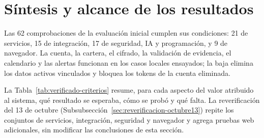 \section{Síntesis y alcance de los resultados}\label{sec:resultados-pruebas}

Las 62 comprobaciones de la evaluación inicial cumplen sus condiciones: 21 de servicios, 15 de integración, 17 de seguridad, IA y programación, y 9 de navegador. La cuenta, la cartera, el cifrado, la validación de evidencia, el calendario y las alertas funcionan en los casos locales ensayados; la baja elimina los datos activos vinculados y bloquea los tokens de la cuenta eliminada.

La Tabla~\ref{tab:verificado-criterios} resume, para cada aspecto del valor atribuido al sistema, qué resultado se esperaba, cómo se probó y qué falta. La reverificación del 13 de octubre (Subsubsección~\ref{sec:reverificacion-octubre13}) repite los conjuntos de servicios, integración, seguridad y navegador y agrega pruebas web adicionales, sin modificar las conclusiones de esta sección.

